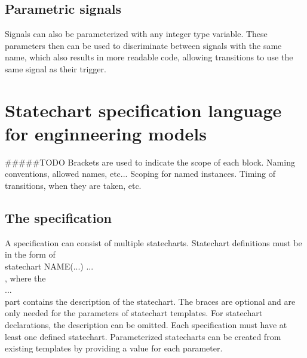   \subsection{Parametric signals}
Signals can also be parameterized with any integer type variable. These parameters then can be used to discriminate between signals with the same name, which also results in more readable code, allowing transitions to use the same signal as their trigger.
\section{Statechart specification language for enginneering models}
#####TODO Brackets are used to indicate the scope of each block. Naming conventions, allowed names, etc... Scoping for named instances. Timing of transitions, when they are taken, etc.
  \subsection{The specification}
A specification can consist of multiple statecharts. Statechart definitions must be in the form of \\statechart NAME(...) { ... }\\, where the \\{ ... }\\ part contains the description of the statechart. The braces are optional and are only needed for the parameters of statechart templates. For statechart declarations, the description can be omitted. Each specification must have at least one defined statechart. Parameterized statecharts can be created from existing templates by providing a value for each parameter.
